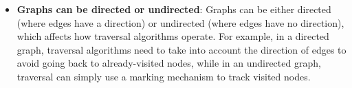 \documentclass[11pt]{article}
\begin{document}
\begin{enumerate}
\begin{itemize}
    \item \textbf{Graphs can be directed or undirected}: Graphs can be either directed (where edges have a direction) or undirected (where edges have no direction), which affects how traversal algorithms operate. For example, in a directed graph, traversal algorithms need to take into account the direction of edges to avoid going back to already-visited nodes, while in an undirected graph, traversal can simply use a marking mechanism to track visited nodes.
\end{itemize}

\end{enumerate}
\end{document}
